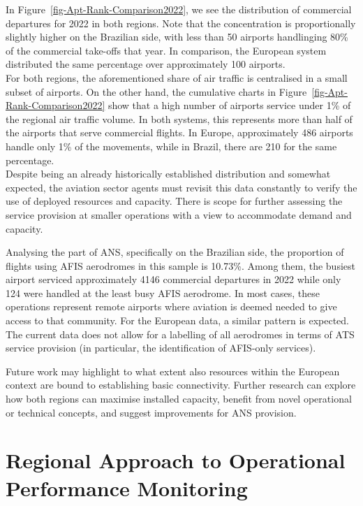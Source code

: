 \documentclass[
  a4paper,
  DIV=11,
  numbers=noendperiod]{scrreport}
\begin{document}
In Figure~\ref{fig-Apt-Rank-Comparison2022}, we see the distribution of
commercial departures for 2022 in both regions. Note that the
concentration is proportionally slightly higher on the Brazilian side,
with less than 50 airports handlinging 80\% of the commercial take-offs
that year. In comparison, the European system distributed the same
percentage over approximately 100 airports.\\
For both regions, the aforementioned share of air traffic is centralised
in a small subset of airports. On the other hand, the cumulative charts
in Figure~\ref{fig-Apt-Rank-Comparison2022} show that a high number of
airports service under 1\% of the regional air traffic volume. In both
systems, this represents more than half of the airports that serve
commercial flights. In Europe, approximately 486 airports handle only
1\% of the movements, while in Brazil, there are 210 for the same
percentage.\\
Despite being an already historically established distribution and
somewhat expected, the aviation sector agents must revisit this data
constantly to verify the use of deployed resources and capacity. There
is scope for further assessing the service provision at smaller
operations with a view to accommodate demand and capacity.

Analysing the part of ANS, specifically on the Brazilian side, the
proportion of flights using AFIS aerodromes in this sample is 10.73\%.
Among them, the busiest airport serviced approximately 4146 commercial
departures in 2022 while only 124 were handled at the least busy AFIS
aerodrome. In most cases, these operations represent remote airports
where aviation is deemed needed to give access to that community. For
the European data, a similar pattern is expected. The current data does
not allow for a labelling of all aerodromes in terms of ATS service
provision (in particular, the identification of AFIS-only services).

Future work may highlight to what extent also resources within the
European context are bound to establishing basic connectivity. Further
research can explore how both regions can maximise installed capacity,
benefit from novel operational or technical concepts, and suggest
improvements for ANS provision.

\hypertarget{regional-approach-to-operational-performance-monitoring}{%
\section{Regional Approach to Operational Performance
Monitoring}\label{regional-approach-to-operational-performance-monitoring}}
\end{document}
